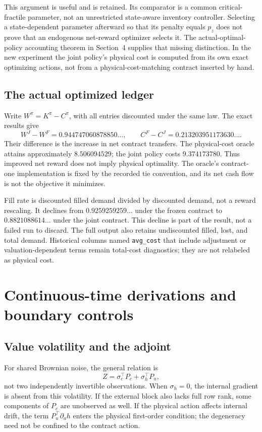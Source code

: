 \documentclass[11pt,letterpaper]{article}
\theoremstyle{definition}
\newcommand{\1}{\mathbf 1}
\begin{document}
This argument is useful and is retained. Its comparator is a common critical-fractile parameter, not an unrestricted state-aware inventory controller. Selecting a state-dependent parameter afterward so that its penalty equals $p_z$ does not prove that an endogenous net-reward optimizer selects it. The actual-optimal-policy accounting theorem in Section~4 supplies that missing distinction. In the new experiment the joint policy's physical cost is computed from its own exact optimizing actions, not from a physical-cost-matching contract inserted by hand.

\subsection{The actual optimized ledger}
Write $W^\pi=K^\pi-C^\pi$, with all entries discounted under the same law. The exact results give
\[
 W^J-W^F=0.944747060878850\ldots,
 \qquad C^F-C^J=0.213203951173630\ldots .
\]
Their difference is the increase in net contract transfers. The physical-cost oracle attains approximately $8.506094529$; the joint policy costs $9.374173780$. Thus improved net reward does not imply physical optimality. The oracle's contract-one implementation is fixed by the recorded tie convention, and its net cash flow is not the objective it minimizes.

Fill rate is discounted filled demand divided by discounted demand, not a reward rescaling. It declines from $0.9259259259\ldots$ under the frozen contract to $0.8821088614\ldots$ under the joint contract. This decline is part of the result, not a failed run to discard. The full output also retains undiscounted filled, lost, and total demand. Historical columns named \texttt{avg\_cost} that include adjustment or valuation-dependent terms remain total-cost diagnostics; they are not relabeled as physical cost.

\section{Continuous-time derivations and boundary controls}
\subsection{Value volatility and the adjoint}
For shared Brownian noise, the general relation is
\[
 Z=\sigma_c^\top P_c+\sigma_h^\top P_u,
\]
not two independently invertible observations. When $\sigma_h=0$, the internal gradient is absent from this volatility. If the external block also lacks full row rank, some components of $P_c$ are unobserved as well. If the physical action affects internal drift, the term $P_u^\top\partial_a h$ enters the physical first-order condition; the degeneracy need not be confined to the contract action.
\end{document}
